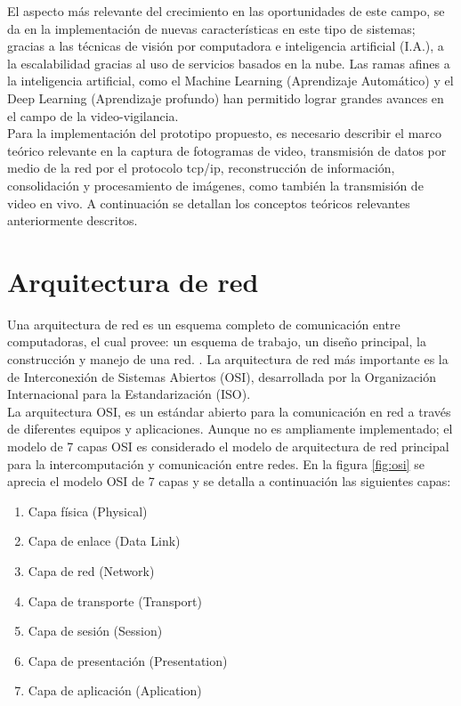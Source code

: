 El aspecto más relevante del crecimiento en las oportunidades de este campo, se da en la implementación de nuevas características en este tipo de sistemas; gracias a las técnicas de visión por computadora e inteligencia artificial (I.A.), a la escalabilidad gracias al uso de servicios basados en la nube. Las ramas afines a la inteligencia artificial, como el Machine Learning (Aprendizaje Automático) y el Deep Learning (Aprendizaje profundo) han permitido lograr grandes avances en el campo de la video-vigilancia.\\

Para la implementación del prototipo propuesto, es necesario describir el marco teórico relevante en la captura de fotogramas de video, transmisión de datos por medio de la red por el protocolo tcp/ip, reconstrucción de información, consolidación y procesamiento de imágenes, como también la transmisión de video en vivo. A continuación se detallan los conceptos teóricos relevantes anteriormente descritos.\\

\section{Arquitectura de red}
Una arquitectura de red es un esquema completo de comunicación entre computadoras, el cual provee: un esquema de trabajo, un diseño principal, la construcción y manejo de una red. \cite[1]{networkProtocolos:handbook}. La arquitectura de red más importante es la de Interconexión de Sistemas Abiertos (OSI), desarrollada por la Organización Internacional para la Estandarización (ISO).\\

La arquitectura OSI, es un estándar abierto para la comunicación en red a través de diferentes equipos y aplicaciones. Aunque no es ampliamente implementado; el modelo de 7 capas OSI es considerado el modelo de arquitectura de red principal para la intercomputación y comunicación entre redes. En la figura \ref{fig:osi} se aprecia el modelo OSI de 7 capas y se detalla a continuación las siguientes capas:

\begin{enumerate}
    \item Capa física (Physical)
    \item Capa de enlace (Data Link)
    \item Capa de red (Network)
    \item Capa de transporte (Transport)
    \item Capa de sesión (Session)
    \item Capa de presentación (Presentation)
    \item Capa de aplicación (Aplication)
\end{enumerate}

